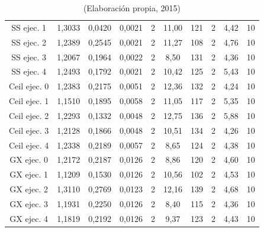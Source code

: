 \begin{table}[hbtp!]
\begin{center}
\begin{tabular}{c|ccc|ccc|ccc}
SS ejec. 1 & 1,3033 & 0,0420 & 0,0021 & 2 & 11,00 & 121 & 2 & 4,42 & 10 \\
SS ejec. 2 & 1,2389 & 0,2545 & 0,0021 & 2 & 11,27 & 108 & 2 & 4,76 & 10 \\
SS ejec. 3 & 1,2067 & 0,1964 & 0,0022 & 2 & 8,50 & 131 & 2 & 4,36 & 10 \\
SS ejec. 4 & 1,2493 & 0,1792 & 0,0021 & 2 & 10,42 & 125 & 2 & 5,43 & 10 \\ \hline
Ceil ejec. 0 & 1,2383 & 0,2175 & 0,0051 & 2 & 12,36 & 132 & 2 & 4,24 & 10 \\
Ceil ejec. 1 & 1,1510 & 0,1895 & 0,0058 & 2 & 11,05 & 117 & 2 & 5,35 & 10 \\
Ceil ejec. 2 & 1,2293 & 0,1332 & 0,0048 & 2 & 12,75 & 136 & 2 & 5,88 & 10 \\
Ceil ejec. 3 & 1,2128 & 0,1866 & 0,0048 & 2 & 10,51 & 134 & 2 & 4,26 & 10 \\
Ceil ejec. 4 & 1,2338 & 0,2189 & 0,0057 & 2 & 8,65 & 124 & 2 & 4,38 & 10 \\ \hline
GX ejec. 0 & 1,2172 & 0,2187 & 0,0126 & 2 & 8,86 & 120 & 2 & 4,60 & 10 \\
GX ejec. 1 & 1,1209 & 0,1530 & 0,0126 & 2 & 10,56 & 102 & 2 & 4,53 & 10 \\
GX ejec. 2 & 1,3110 & 0,2769 & 0,0123 & 2 & 12,16 & 139 & 2 & 4,68 & 10 \\
GX ejec. 3 & 1,1931 & 0,2250 & 0,0126 & 2 & 8,40 & 115 & 2 & 4,36 & 10 \\
GX ejec. 4 & 1,1819 & 0,2192 & 0,0126 & 2 & 9,37 & 123 & 2 & 4,43 & 10 \\
\hline
\end{tabular}
\end{center}
\caption*{(Elaboración propia, 2015)}
\end{table}

